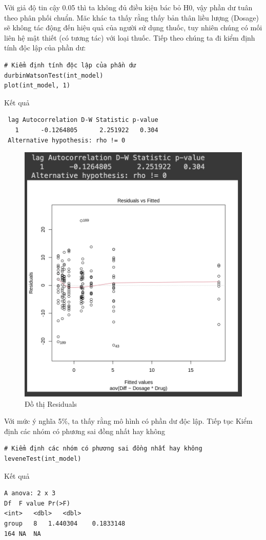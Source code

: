 Với giả độ tin cậy 0.05 thì ta không đủ điều kiện bác bỏ H0, vậy phần dư tuân theo phân phối chuẩn. Măc khác ta thấy rằng thấy bản thân liều lượng (Dosage) sẽ không tác động đến hiệu quả của người sử dụng thuốc, tuy nhiên chúng có mối liên hệ mật thiết (có tương tác) với loại thuốc.
\newpage
Tiếp theo chúng ta đi kiểm định tính độc lập của phần dư:
\begin{lstlisting}
# Kiểm định tính độc lập của phần dư
durbinWatsonTest(int_model)
plot(int_model, 1)
\end{lstlisting}
Kết quả
\begin{lstlisting}
 lag Autocorrelation D-W Statistic p-value
   1      -0.1264805      2.251922   0.304
 Alternative hypothesis: rho != 0
\end{lstlisting}
\begin{figure}[H]
    \centering
    \includegraphics[width=0.8\linewidth]{part01_figures/23.png}
    \caption{Đồ thị  Residuals}
    \label{fig:Đồ thị  Residuals}
\end{figure}
Với mức ý nghĩa 5\%, ta thấy rằng mô hình có phần dư độc lập.
Tiếp tục Kiểm định các nhóm có phương sai đồng nhất hay không

\begin{lstlisting}
# Kiểm định các nhóm có phương sai đồng nhất hay không
leveneTest(int_model)
\end{lstlisting}

Kết quả
\begin{lstlisting}
A anova: 2 x 3
Df	F value	Pr(>F)
<int>	<dbl>	<dbl>
group	8	1.440304	0.1833148
164	NA	NA

\end{lstlisting}

